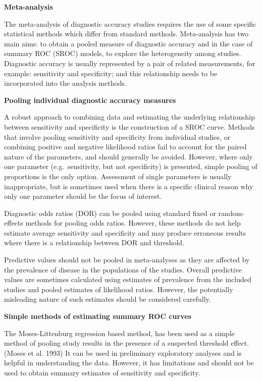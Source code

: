 \documentclass[
  11pt,
  a4paper,
  DIV=11,
  numbers=noendperiod]{scrreprt}
\begin{document}
\textbf{Meta-analysis}

The meta-analysis of diagnostic accuracy studies requires the use of
some specific statistical methods which differ from standard methods.
Meta-analysis has two main aims: to obtain a pooled measure of
diagnostic accuracy and in the case of summary ROC (SROC) models, to
explore the heterogeneity among studies. Diagnostic accuracy is usually
represented by a pair of related measurements, for example: sensitivity
and specificity; and this relationship needs to be incorporated into the
analysis methods.

\textbf{Pooling individual diagnostic accuracy measures}

A robust approach to combining data and estimating the underlying
relationship between sensitivity and specificity is the construction of
a SROC curve. Methods that involve pooling sensitivity and specificity
from individual studies, or combining positive and negative likelihood
ratios fail to account for the paired nature of the parameters, and
should generally be avoided. However, where only one parameter
(e.g.~sensitivity, but not specificity) is presented, simple pooling of
proportions is the only option. Assessment of single parameters is
usually inappropriate, but is sometimes used when there is a specific
clinical reason why only one parameter should be the focus of interest.

Diagnostic odds ratios (DOR) can be pooled using standard fixed or
random-effects methods for pooling odds ratios. However, these methods
do not help estimate average sensitivity and specificity and may produce
erroneous results where there is a relationship between DOR and
threshold.

Predictive values should not be pooled in meta-analyses as they are
affected by the prevalence of disease in the populations of the studies.
Overall predictive values are sometimes calculated using estimates of
prevalence from the included studies and pooled estimates of likelihood
ratios. However, the potentially misleading nature of such estimates
should be considered carefully.

\textbf{Simple methods of estimating summary ROC curves}

The Moses-Littenburg regression based method, has been used as a simple
method of pooling study results in the presence of a suspected threshold
effect. (Moses et al. 1993) It can be used in preliminary exploratory
analyses and is helpful in understanding the data. However, it has
limitations and should not be used to obtain summary estimates of
sensitivity and specificity.
\end{document}
